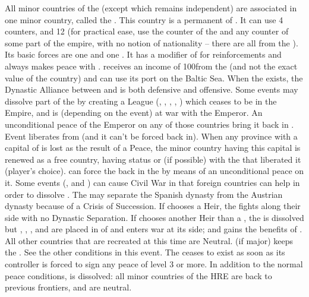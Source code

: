 \begin{digressions}
  \effetlong
  \aparag All minor countries of the \HRE (except \HAB which remains
  independent) are associated in one minor country, called the . This country is a permanent \VASSAL of \MAJHAB. It can use 4
  \ARMY counters, and 12 \LD (for practical ease, use the counter of the \HRE
  and any counter of some part of the empire, with no notion of nationality --
  there are all from the \GE).  Its basic forces are one \ARMY\faceplus and
  one \ARMY\facemoins. It has a modifier of  for reinforcements and
  always makes peace with \MAJHAB.
  \aparag \MAJHAB receives an income of 100\ducats from the \HRE (and not the
  exact value of the country) and can use its port on the Baltic Sea.
  \aparag When the  exists, the Dynastic Alliance between
  \AUSmin and \SPA is both defensive and offensive.
  \aparag Some events may dissolve part of the  by
  creating a League (, , , , ) which ceases to be in the Empire,
  and is (depending on the event) at war with the Emperor. An unconditional
  peace of the Emperor on any of those countries bring it back in .
  \aparag Event  liberates \paysBrandebourg from
   (and it can't be forced back in).
  \aparag When any province with a capital of  is lost as
  the result of a Peace, the minor country having this capital is renewed as a
  free country, having status \EG or \VASSAL (if possible) with the \MAJ that
  liberated it (player's choice). \HAB can force the \MIN back in the
   by means of an unconditional peace on it.
  \aparag Some events (,  and ) can cause Civil War in  that foreign countries can help in order to dissolve .
  \aparag The  may separate the Spanish dynasty from the
  Austrian dynasty because of a Crisis of Succession.
  \bparag If \SPA chooses a \AUSmin Heir, the  fights
  along their side with no Dynastic Separation.
  \bparag If \SPA chooses another Heir than a \AUSmin, the  is dissolved but \paysBaviere, \paysMayence, \paysLorraine,
  \paysBade and \paysWurtemberg are placed in \AM of \HAB and enters war at
  its side; and \HAB gains the benefits of . All other countries that are recreated at this time are
  Neutral.
  \bparag \AUS (if major) keeps the .
  \bparag See the other conditions in this event.
  \aparag The  ceases to exist as soon as its controller
  is forced to sign any peace of level 3 or more.  In addition to the normal
  peace conditions,  is dissolved: all minor countries of
  the HRE are back to previous frontiers, and are neutral.
\end{digressions}

